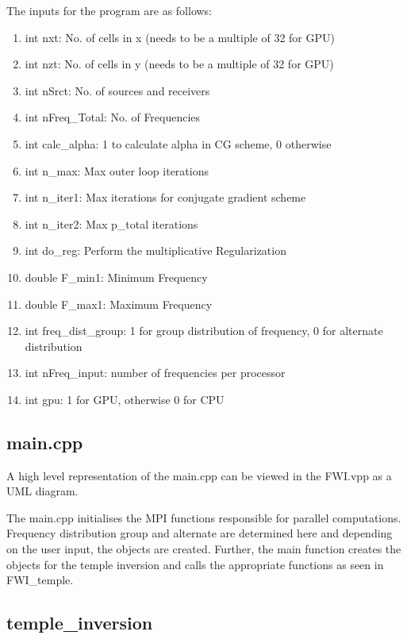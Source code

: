 \documentclass[10pt,a4paper]{article}
\begin{document}
The inputs for the program are as follows:
\begin{enumerate}
    \item int nxt: No. of cells in x (needs to be a multiple of 32 for GPU)
    \item int nzt: No. of cells in y (needs to be a multiple of 32 for GPU)
    \item int nSrct: No. of sources and receivers
    \item int nFreq\_Total: No. of Frequencies
    \item int calc\_alpha: 1 to calculate alpha in CG scheme, 0 otherwise
    \item int n\_max: Max outer loop iterations
    \item int n\_iter1: Max iterations for conjugate gradient scheme
    \item int n\_iter2: Max p\_total iterations
    \item int do\_reg: Perform the multiplicative Regularization
    \item double F\_min1: Minimum Frequency
    \item double F\_max1: Maximum Frequency
    \item int freq\_dist\_group: 1 for group distribution of frequency, 0 for alternate distribution
    \item int nFreq\_input: number of frequencies per processor
    \item int gpu: 1 for GPU, otherwise 0 for CPU
\end{enumerate}

\subsection{main.cpp}

A high level representation of the main.cpp can be viewed in the FWI.vpp as a UML diagram. 
\newline

The main.cpp initialises the MPI functions responsible for parallel computations. Frequency distribution group and alternate are determined here and depending on the user input, the objects are created. Further, the main function creates the objects for the temple inversion and calls the appropriate functions as seen in FWI\_temple.

\subsection{temple\_inversion}
\end{document}
